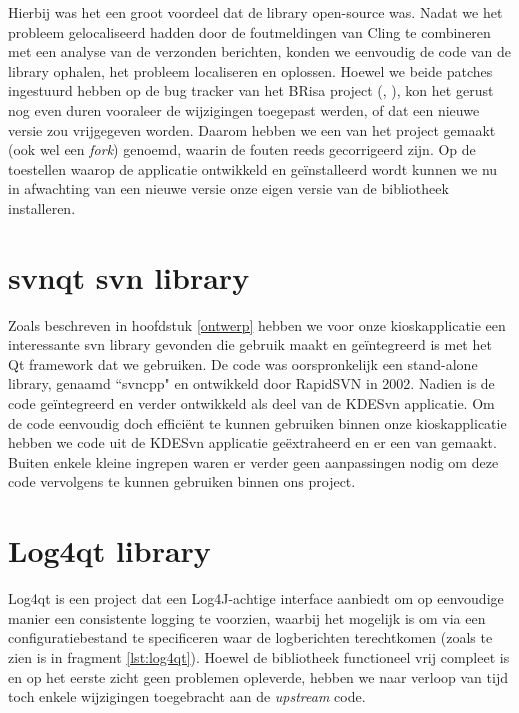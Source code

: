 Hierbij was het een groot voordeel dat de library open-source was. Nadat we het probleem gelocaliseerd hadden door de foutmeldingen van Cling te combineren met een analyse van de verzonden berichten, konden we eenvoudig de code van de library ophalen, het probleem localiseren en oplossen. Hoewel we beide patches ingestuurd hebben op de bug tracker van het BRisa project (, ), kon het gerust nog even duren vooraleer de wijzigingen toegepast werden, of dat een nieuwe versie zou vrijgegeven worden. Daarom hebben we een  van het project gemaakt (ook wel een \emph{fork}) genoemd, waarin de fouten reeds gecorrigeerd zijn. Op de toestellen waarop de applicatie ontwikkeld en geïnstalleerd wordt kunnen we nu in afwachting van een nieuwe versie onze eigen versie van de bibliotheek installeren.

\section{svnqt \acs{svn} library}
\label{kiosk:realisatie:svnqt}

Zoals beschreven in hoofdstuk \ref{ontwerp} hebben we voor onze kioskapplicatie een interessante \ac{svn} library gevonden die gebruik maakt en geïntegreerd is met het Qt framework dat we gebruiken. De code was oorspronkelijk een stand-alone library, genaamd ``svncpp" en ontwikkeld door RapidSVN in 2002. Nadien is de code geïntegreerd en verder ontwikkeld als deel van de KDESvn applicatie. Om de code eenvoudig doch efficiënt te kunnen gebruiken binnen onze kioskapplicatie hebben we code uit de KDESvn applicatie geëxtraheerd en er een  van gemaakt. Buiten enkele kleine ingrepen waren er verder geen aanpassingen nodig om deze code vervolgens te kunnen gebruiken binnen ons project.

\section{Log4qt library}
\label{kiosk:realisatie:log4qt}

Log4qt is een project dat een Log4J-achtige interface aanbiedt om op eenvoudige manier een consistente logging te voorzien, waarbij het mogelijk is om via een configuratiebestand te specificeren waar de logberichten terechtkomen (zoals te zien is in fragment \ref{lst:log4qt}). Hoewel de bibliotheek functioneel vrij compleet is en op het eerste zicht geen problemen opleverde, hebben we naar verloop van tijd toch enkele wijzigingen toegebracht aan de \emph{upstream} code.

